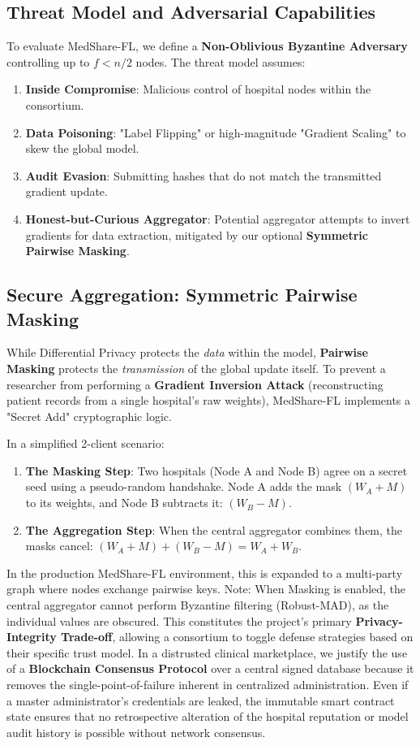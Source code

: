 \documentclass[10pt, a4paper, twocolumn]{article}
\begin{document}
\subsection{Threat Model and Adversarial Capabilities}
To evaluate MedShare-FL, we define a \textbf{Non-Oblivious Byzantine Adversary} controlling up to $f < n/2$ nodes. The threat model assumes:
\begin{enumerate}
    \item \textbf{Inside Compromise}: Malicious control of hospital nodes within the consortium.
    \item \textbf{Data Poisoning}: "Label Flipping" or high-magnitude "Gradient Scaling" to skew the global model.
    \item \textbf{Audit Evasion}: Submitting hashes that do not match the transmitted gradient update.
    \item \textbf{Honest-but-Curious Aggregator}: Potential aggregator attempts to invert gradients for data extraction, mitigated by our optional \textbf{Symmetric Pairwise Masking}.
\end{enumerate}

\subsection{Secure Aggregation: Symmetric Pairwise Masking}
While Differential Privacy protects the \textit{data} within the model, \textbf{Pairwise Masking} protects the \textit{transmission} of the global update itself. To prevent a researcher from performing a \textbf{Gradient Inversion Attack} (reconstructing patient records from a single hospital's raw weights), MedShare-FL implements a "Secret Add" cryptographic logic. 

In a simplified 2-client scenario:
\begin{enumerate}
    \item \textbf{The Masking Step}: Two hospitals (Node A and Node B) agree on a secret seed using a pseudo-random handshake. Node A adds the mask $(W_A + M)$ to its weights, and Node B subtracts it: $(W_B - M)$.
    \item \textbf{The Aggregation Step}: When the central aggregator combines them, the masks cancel: $(W_A + M) + (W_B - M) = W_A + W_B$.
\end{enumerate}

In the production MedShare-FL environment, this is expanded to a multi-party graph where nodes exchange pairwise keys. Note: When Masking is enabled, the central aggregator cannot perform Byzantine filtering (Robust-MAD), as the individual values are obscured. This constitutes the project's primary \textbf{Privacy-Integrity Trade-off}, allowing a consortium to toggle defense strategies based on their specific trust model. In a distrusted clinical marketplace, we justify the use of a \textbf{Blockchain Consensus Protocol} over a central signed database because it removes the single-point-of-failure inherent in centralized administration. Even if a master administrator's credentials are leaked, the immutable smart contract state ensures that no retrospective alteration of the hospital reputation or model audit history is possible without network consensus.
\end{document}
